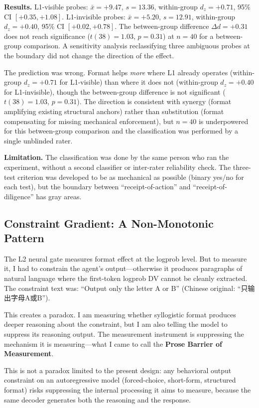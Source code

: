 \documentclass[11pt]{article}
\begin{document}
\textbf{Results.} L1-visible probes: $\bar{x}=+9.47$, $s=13.36$, within-group
$d_z=+0.71$, 95\% CI $[+0.35, +1.08]$. L1-invisible probes: $\bar{x}=+5.20$,
$s=12.91$, within-group $d_z=+0.40$, 95\% CI $[+0.02, +0.78]$. The between-group
difference $\Delta d=+0.31$ does not reach significance ($t(38)=1.03$, $p=0.31$)
at $n=40$ for a between-group comparison. A sensitivity analysis reclassifying three ambiguous probes at the
boundary did not change the direction of the effect.

The prediction was wrong. Format helps \textit{more} where L1 already operates
(within-group $d_z=+0.71$ for L1-visible) than where it does not (within-group
$d_z=+0.40$ for L1-invisible), though the between-group difference is not
significant ($t(38)=1.03$, $p=0.31$). The direction is consistent with synergy
(format amplifying existing structural anchors) rather than substitution (format
compensating for missing mechanical enforcement), but $n=40$ is underpowered for
this between-group comparison and the classification was performed by a single
unblinded rater.

\textbf{Limitation.} The classification was done by the same person who ran the
experiment, without a second classifier or inter-rater reliability check. The
three-test criterion was developed to be as mechanical as possible (binary
yes/no for each test), but the boundary between ``receipt-of-action'' and
``receipt-of-diligence'' has gray areas.

\subsection{Constraint Gradient: A Non-Monotonic Pattern}
\label{sec:gradient}

The L2 neural gate measures format effect at the logprob level. But to measure
it, I had to constrain the agent's output---otherwise it produces paragraphs of
natural language where the first-token logprob DV cannot be cleanly extracted.
The constraint text was: ``Output only the letter A or B'' (Chinese original:
``只输出字母A或B'').

This creates a paradox. I am measuring whether syllogistic format produces
deeper reasoning about the constraint, but I am also telling the model to
suppress its reasoning output. The measurement instrument is suppressing the
mechanism it is measuring---what I came to call the \textbf{Prose Barrier of
Measurement}.

This is not a paradox limited to the present design: any behavioral output
constraint on an autoregressive model (forced-choice, short-form, structured
format) risks suppressing the internal processing it aims to measure, because
the same decoder generates both the reasoning and the response.
\end{document}
